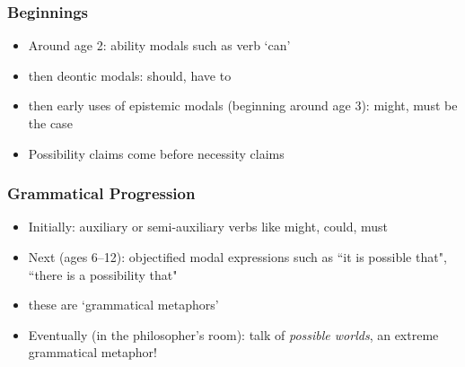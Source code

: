 \begin{frame}
\frametitle{Beginnings}

\begin{itemize}[<+->]

\item Around age 2: ability modals such as verb `can'

\item then deontic modals: should, have to

\item then early uses of epistemic modals (beginning around age 3): might, must be the case

\item Possibility claims come before necessity claims


\end{itemize}
\end{frame}

\begin{frame}
\frametitle{Grammatical Progression}

\begin{itemize}[<+->]

\item Initially: auxiliary or semi-auxiliary verbs like might, could, must

\item Next (ages 6--12): objectified modal expressions such as ``it is possible that", ``there is a possibility that"
\item[] these are `grammatical metaphors'

\item Eventually (in the philosopher's room): talk of \textit{possible worlds}, an extreme grammatical metaphor!

\end{itemize}
\end{frame}

